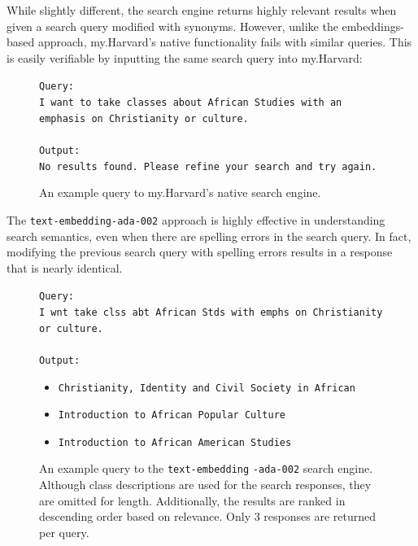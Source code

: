 \documentclass[
	a4paper, %
	10pt, %
	unnumberedsections, %
	twoside, %
]{LTJournalArticle}
\begin{document}
While slightly different, the search engine returns highly relevant results when given a search query modified with synonyms. However, unlike the embeddings-based approach, my.Harvard's native functionality fails with similar queries. This is easily verifiable by inputting the same search query into my.Harvard: 


\begin{figure}[h]
	\begin{center}
		\texttt{Query:} \\
		\texttt{I want to take classes about African Studies with an emphasis on Christianity or culture.} \\
		\texttt{}\\
		\texttt{Output: }\\
		\texttt{No results found. Please refine your search and try again.}		 
	\end{center}
	\caption{An example query to my.Harvard's native search engine.}
	\label{fig:ex2}
\end{figure}


The \texttt{text-embedding-ada-002} approach is highly effective in understanding search semantics, even when there are spelling errors in the search query. In fact, modifying the previous search query with spelling errors results in a response that is nearly identical.

\begin{figure}[h]
	\begin{center}
		\texttt{Query:} \\
		\texttt{I wnt take clss abt African Stds with emphs on Christianity or culture.} \\
		\texttt{}\\
		\texttt{Output:} 
	\end{center}
\end{figure}

\begin{figure}
	\begin{center}
		\begin{itemize}
			\item \texttt{Christianity, Identity and Civil Society in African}
			\item \texttt{Introduction to African Popular Culture}
			\item \texttt{Introduction to African American Studies}
		\end{itemize}		
	\end{center}

	\caption{An example query to the \texttt{text-embedding} \texttt{-ada-002} search engine. Although class descriptions are used for the search responses, they are omitted for length. Additionally, the results are ranked in descending order based on relevance. Only 3 responses are returned per query.}
\end{figure}
\end{document}
